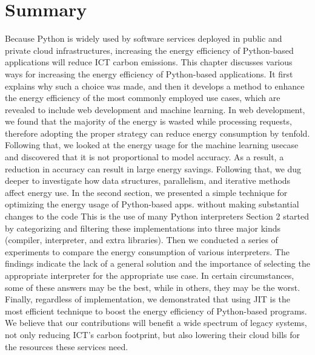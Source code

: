 \section{Summary}
Because Python is widely used by software services deployed in public and private cloud infrastructures, increasing the energy efficiency of Python-based applications will reduce ICT carbon emissions.
This chapter discusses various ways for increasing the energy efficiency of Python-based applications. It first explains why such a choice was made, and then it develops a method to enhance the energy efficiency of the most commonly employed use cases, which are revealed to include web development and machine learning.
In web development, we found that the majority of the energy is wasted while processing requests, therefore adopting the proper strategy can reduce energy consumption by tenfold.
Following that, we looked at the energy usage for the machine learning usecase and discovered that it is not proportional to model accuracy.
As a result, a reduction in accuracy can result in large energy savings.
Following that, we dug deeper to investigate how data structures, parallelism, and iterative methods affect energy use.
In the second section, we presented a simple technique for optimizing the energy usage of Python-based apps. without making substantial changes to the code This is the use of many Python interpreters
Section 2 started by categorizing and filtering these implementations into three major kinds (compiler, interpreter, and extra libraries).
Then we conducted a series of experiments to compare the energy consumption of various interpreters.
The findings indicate the lack of a general solution and the importance of selecting the appropriate interpreter for the appropriate use case. In certain circumstances, some of these answers may be the best, while in others, they may be the worst.
Finally, regardless of implementation, we demonstrated that using JIT is the most efficient technique to boost the energy efficiency of Python-based programs.
We believe that our contributions will benefit a wide spectrum of legacy systems, not only reducing ICT's carbon footprint, but also lowering their cloud bills for the resources these services need.